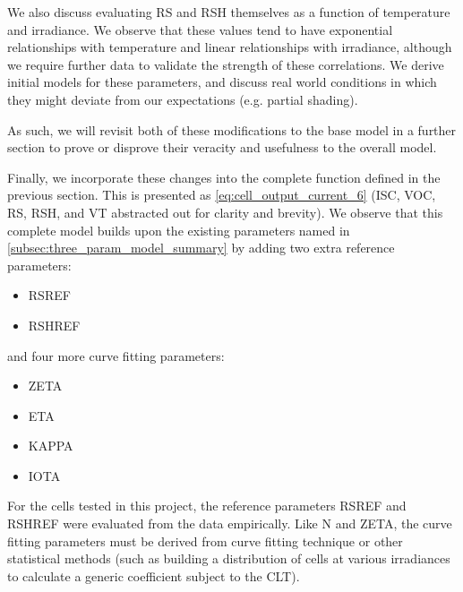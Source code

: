 We also discuss evaluating \ac{RS} and \ac{RSH} themselves as a function of
temperature and irradiance. We observe that these values tend to have
exponential relationships with temperature and linear relationships with
irradiance, although we require further data to validate the strength of these
correlations. We derive initial models for these parameters, and discuss real
world conditions in which they might deviate from our expectations (e.g. partial
shading).

As such, we will revisit both of these modifications to the base model in a
further section to prove or disprove their veracity and usefulness to the
overall model.

Finally, we incorporate these changes into the complete function defined in the
previous section. This is presented as \autoref{eq:cell_output_current_6}
(\ac{ISC}, \ac{VOC}, \ac{RS}, \ac{RSH}, and \ac{VT} abstracted out for clarity
and brevity). We observe that this complete model builds upon the existing
parameters named in \autoref{subsec:three_param_model_summary} by adding two
extra reference parameters:

\begin{itemize}
    \item \acf{RSREF}
    \item \acf{RSHREF}
\end{itemize}

and four more curve fitting parameters:

\begin{itemize}
    \item \acf{ZETA}
    \item \acf{ETA}
    \item \acf{KAPPA}
    \item \acf{IOTA}
\end{itemize}

For the cells tested in this project, the reference parameters \ac{RSREF} and
\ac{RSHREF} were evaluated from the data empirically. Like \acf{N} and
\acf{ZETA}, the curve fitting parameters must be derived from curve fitting
technique or other statistical methods (such as building a distribution of cells
at various irradiances to calculate a generic coefficient subject to the
\ac{CLT}).

